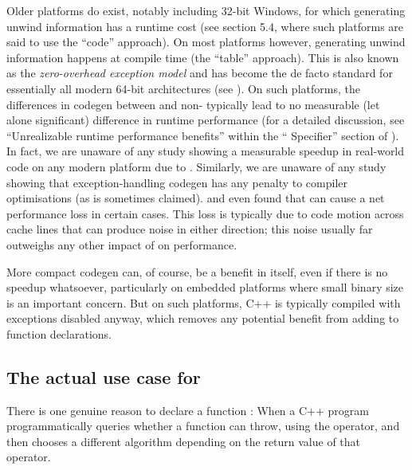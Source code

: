 Older platforms do exist, notably including 32-bit Windows, for which generating unwind information has a runtime cost (see \cite{TR18015} section 5.4, where such platforms are said to use the ``code'' approach). On most platforms however, generating unwind information happens at compile time (the ``table'' approach). This is also known as the \emph{zero-overhead exception model} and has become the de facto standard for essentially all modern 64-bit architectures (see \cite{Mortoray2013}). On such platforms, the differences in codegen between  and non- typically lead to no measurable (let alone significant) difference in runtime performance (for a detailed discussion, see ``Unrealizable runtime performance benefits'' within the `` Specifier'' section of \cite{EMC++S}). In fact, we are unaware of any study showing a measurable speedup in real-world code on any modern platform due to . Similarly, we are unaware of any study showing that exception-handling codegen has any penalty to compiler optimisations (as is sometimes claimed). \cite{Mahaffey2017} and \cite{Dekker2019} even found that  can cause a net performance loss in certain cases. This loss is typically due to code motion across cache lines that can produce noise in either direction; this noise usually far outweighs any other impact of  on performance.

More compact codegen can, of course, be a benefit in itself, even if there is no speedup whatsoever, particularly on embedded platforms where small binary size is an important concern. But on such platforms, C++ is typically compiled with exceptions disabled anyway, which removes any potential benefit from adding  to function declarations.

\subsection{The actual use case for }

There is one genuine reason to declare a function : When a C++ program programmatically queries whether a function can throw, using the  operator, and then chooses a different algorithm depending on the return value of that operator.

